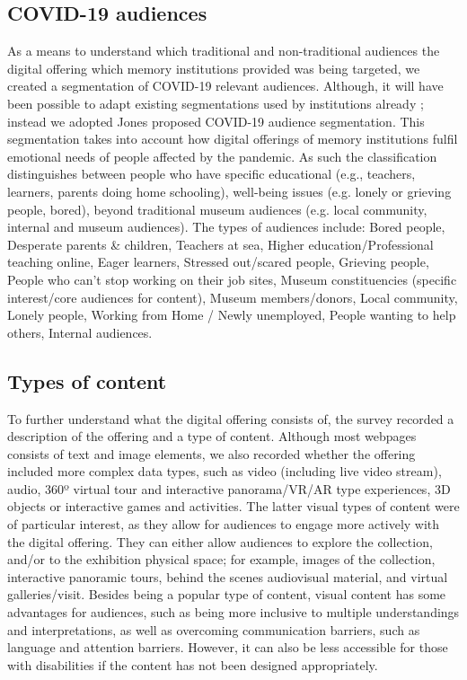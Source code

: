 \documentclass{egpubl}
\begin{document}
\subsection{COVID-19 audiences}
As a means to understand which traditional and non-traditional audiences the digital offering which memory institutions provided was being targeted, we created a segmentation of COVID-19 relevant audiences. Although, it will have been possible to adapt existing segmentations used by institutions already \cite{Drot19}; instead we adopted Jones \cite{Audiences2020} proposed COVID-19 audience segmentation. This segmentation takes into account how digital offerings of memory institutions fulfil emotional needs of people affected by the pandemic. As such the classification distinguishes between people who have specific educational (e.g., teachers, learners, parents doing home schooling), well-being issues (e.g. lonely or grieving  people, bored), beyond traditional museum audiences (e.g. local community, internal and museum audiences). The types of audiences include: Bored people, Desperate parents \& children, Teachers at sea, Higher education/Professional teaching online, Eager learners, Stressed out/scared people, Grieving people, People who can’t stop working on their job sites, Museum constituencies (specific interest/core audiences for content), Museum members/donors, Local community, Lonely people, Working from Home / Newly unemployed, People wanting to help others, Internal audiences.

\subsection{Types of content}
To further understand what the digital offering consists of, the survey recorded a description of the offering and a type of content. Although most webpages consists of text and image elements, we also recorded whether the offering included more complex data types, such as video (including live video stream), audio, 360º virtual tour and interactive panorama/VR/AR type experiences, 3D objects or interactive games and activities. The latter visual types of content were of particular interest, as they allow for audiences to engage more actively with the digital offering. They can either allow audiences to explore the collection, and/or to the exhibition physical space; for example, images of the collection, interactive panoramic tours,  behind the scenes audiovisual material, and virtual galleries/visit. Besides being a popular type of content, visual content has some advantages for audiences, such as being more inclusive to multiple understandings and interpretations, as well as overcoming communication barriers, such as language and attention barriers. However, it can also be less accessible for those with disabilities if the content has not been designed appropriately.
\end{document}

